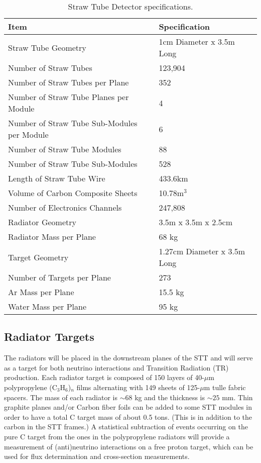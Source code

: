 \documentclass[aps,prl,preprint,groupedaddress]{revtex4}
\begin{document}
\begin{table}
\centering
  \caption{\label{STT_details} Straw Tube Detector specifications.}
  \begin{tabular}{| l | l |}
    \hline
Item&Specification \\
    \hline
Straw Tube Geometry & 1cm Diameter x 3.5m Long \\
Number of Straw Tubes & 123,904 \\
Number of Straw Tubes per Plane & 352 \\
Number of Straw Tube Planes per Module & 4 \\
Number of Straw Tube Sub-Modules per Module & 6 \\
Number of Straw Tube Modules & 88 \\
Number of Straw Tube Sub-Modules & 528 \\
Length of Straw Tube Wire & 433.6km \\
Volume of Carbon Composite Sheets & 10.78m$^3$ \\
Number of Electronics Channels & 247,808 \\
Radiator Geometry & 3.5m x 3.5m x 2.5cm \\
Radiator Mass per Plane & 68 kg \\
Target Geometry & 1.27cm Diameter x 3.5m Long \\
Number of Targets per Plane & 273 \\
Ar Mass per Plane & 15.5 kg \\
Water Mass per Plane & 95 kg \\
     \hline
  \end{tabular}
\end{table}

\subsection{Radiator Targets}

The radiators will be placed in the downstream planes of the STT
and will serve as a target for both neutrino interactions 
and Transition Radiation (TR) production. Each radiator target is composed of 
150 layers of 40-$\mu$m polypropylene (C$_3$H$_6$)$_n$ 
films alternating with 149 sheets of 125-$\mu$m tulle fabric spacers. 
The mass of each radiator is $\sim 68$ kg and the thickness is 
$\sim 25$ mm. %
Thin graphite planes and/or Carbon fiber foils can be added to some STT modules
in order to have a total C target mass of about 0.5 tons. (This is in addition to
the carbon in the STT frames.) A statistical subtraction of events occurring
on the pure C target from the ones in the polypropylene radiators will provide a measurement of
(anti)neutrino interactions on a free proton target, which can be used for flux determination and cross-section
measurements.
\end{document}
